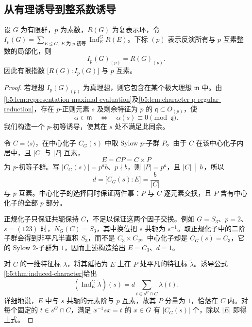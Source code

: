 \subsection{从有理诱导到整系数诱导}
\label{b5:subsec:0504:03}

\begin{theorem}[逐素数的整诱导]\label{b5:thm:brauer-local-induction}
	设 \(G\) 为有限群，\(p\) 为素数，\(R(G)\) 为复表示环，令 \(I_p(G)=\sum_{E\le G,\ E\text{ 为 }p\text{-初等}}\operatorname{Ind}_E^G R(E)\)。下标 \((p)\) 表示反演所有与 \(p\) 互素整数的局部化，则
	\[
		I_p(G)_{(p)}=R(G)_{(p)}.
	\]
	因此有限指数 \(\bigl[R(G):I_p(G)\bigr]\) 与 \(p\) 互素。
\end{theorem}
\begin{proof}
	若理想 \(I_p(G)_{(p)}\) 为真理想，则它包含在某个极大理想 \(\mathfrak m\) 中。由\cref{b5:lem:representation-maximal-evaluation}及\cref{b5:lem:character-p-regular-reduction}，存在 \(p\)-正则元素 \(s\) 及剩余特征为 \(p\) 的 \(\mathfrak q\subset O_{(p)}\)，使
	\[
		\alpha\in\mathfrak m\quad\Longleftrightarrow\quad \alpha(s)\equiv0\pmod{\mathfrak q}.
	\]
	我们构造一个 \(p\)-初等诱导，使其在 \(s\) 处不满足此同余。

	令 \(C=\langle s\rangle\)，在中心化子 \(C_G(s)\) 中取 Sylow \(p\)-子群 \(P\)。由于 \(C\) 在该中心化子内居中，且 \(|C|\) 与 \(|P|\) 互素，
	\[
		E=CP=C\times P
	\]
	为 \(p\)-初等子群。写 \(|C_G(s)|=p^a b\)、\(p\nmid b\)，则 \(|P|=p^a\)，且 \(|C|\,\bigm\vert\,b\)，所以
	\[
		d=\bigl[C_G(s):E\bigr]=\frac{b}{|C|}
	\]
	与 \(p\) 互素。中心化子的选择同时保证两件事：\(P\) 与 \(C\) 逐元素交换，且 \(P\) 含有中心化子的全部 \(p\) 部分。

	正规化子只保证共轭保持 \(C\)，不足以保证这两个因子交换。例如 \(G=S_3\)、\(p=2\)、\(s=(123)\) 时，\(N_G(C)=S_3\)，其中换位把 \(s\) 共轭为 \(s^{-1}\)。取正规化子中的二阶子群会得到非平凡半直积 \(S_3\)，而不是 \(C_3\times C_2\)。中心化子却是 \(C_G(s)=C_3\)，它的 Sylow \(2\)-子群为 \(1\)，因而上述构造给出 \(E=C_3\)、\(d=1\)。

	对 \(C\) 的一维特征标 \(\lambda\)，将其延拓为 \(E\) 上在 \(P\) 处平凡的特征标 \(\widetilde\lambda\)。诱导公式\cref{b5:thm:induced-character}给出
	\begin{equation}\label{b5:eq:elementary-induction-evaluation}
		\left(\operatorname{Ind}_E^G\widetilde\lambda\right)(s) =d\sum_{t\in s^G\cap C}\lambda(t).
	\end{equation}
	详细地说，\(E\) 中与 \(s\) 共轭的元素阶与 \(p\) 互素，故其 \(P\) 分量为 \(1\)，恰落在 \(C\) 内。对每个固定的 \(t\in s^G\cap C\)，满足 \(x^{-1}sx=t\) 的 \(x\in G\) 有 \(|C_G(s)|\) 个，除以 \(|E|\) 即得上式。


\end{proof}
